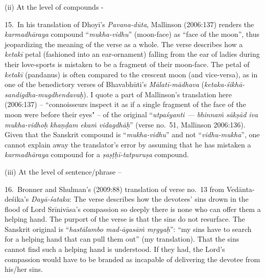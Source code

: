 (ii) At the level of compounds -

15.~In his translation of Dhoyī’s \textsl{Pavana-dūta}, Mallinson (2006:137) renders the \textsl{karmadhāraya} compound “\textsl{mukha-vidhu}” (moon-face) as “face of the moon”, thus jeopardizing the meaning of the verse as a whole. The verse describes how a \textsl{ketakī} petal (fashioned into an ear-ornament) falling from the ear of ladies during their love-sports is mistaken to be a fragment of their moon-face. The petal of \textsl{ketakī} (pandanus) is often compared to the crescent moon (and vice-versa), as in one of the benedictory verses of Bhavabhūti’s \textsl{Mālatī-mādhava} (\textsl{ketaka-śikhā-sandigdha-mugdhendavaḥ}). I quote a part of Mallinson's translation here (2006:137) -- ``connoisseurs inspect it as if a single fragment of the face of the moon were before their eyes" -- of the original “\textsl{utpaśyanti --- bhinnaṁ sākṣād iva mukha-vidhoḥ khaṇḍam ekaṁ vidagdhāḥ}” (verse no.\ 51, Mallinson 2006:136). Given that the Sanskrit compound is “\textsl{mukha-vidhu}” and not “\textsl{vidhu-mukha}”, one cannot explain away the translator’s error by assuming that he has mistaken a \textsl{karmadhāraya} compound for a \textsl{ṣaṣṭḥī-tatpuruṣa} compound. 

(iii) At the level of sentence/phrase -- 

16.~Bronner and Shulman's (2009:88) translation of verse no.\ 13 from Vedānta-deśika’s \textsl{Dayā-śataka}: The verse describes how the devotees’ sins drown in the flood of Lord Srīnivāsa’s compassion so deeply there is none who can offer them a helping hand. The purport of the verse is that the sins do not resurface. The Sanskrit original is “\textsl{hastālambo mad-āgasāṁ mṛgyaḥ}”: “my sins have to search for a helping hand that can pull them out” (my translation). That the sins cannot find such a helping hand is understood. If they had, the Lord’s compassion would have to be branded as incapable of delivering the devotee from his/her sins.

